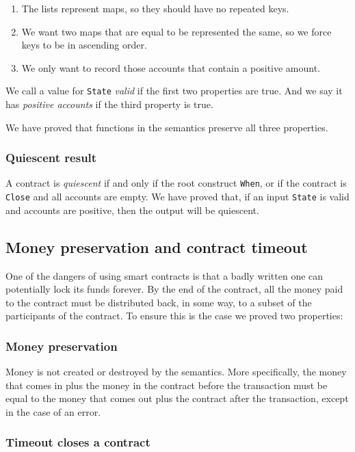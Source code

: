\documentclass[runningheads]{llncs}
\begin{document}
\begin{enumerate}
    \item The lists represent maps, so they should have no repeated keys.
    \item We want two maps that are equal to be represented the same, so we force keys to be in ascending order.
    \item We only want to record those accounts that contain a positive amount.
\end{enumerate}
\noindent
We call a value for \texttt{State} \emph{valid} if the first two properties are true. And we say it has \emph{positive accounts} if the third property is true.

We have proved that functions in the semantics preserve all three properties.

\subsubsection{Quiescent result}

A contract is \emph{quiescent} if and only if the root construct \texttt{When}, or if the contract is \texttt{Close} and all accounts are empty. We have proved that, if an input \texttt{State} is valid and accounts are positive, then the output will be quiescent.

\subsection{Money preservation and contract timeout}

One of the dangers of using smart contracts is that a badly written one can potentially lock its funds forever. By the end of the contract, all the money paid to the contract must be distributed back, in some way, to a subset of the participants of the contract.
To ensure this is the case we proved two properties:

\subsubsection{Money preservation}
Money is not created or destroyed by the semantics. More specifically, the money that comes in plus the money in the contract before the transaction must be equal to the money that comes out plus the contract after the transaction, except in the case of an error.

\subsubsection{Timeout closes a contract}
\end{document}
